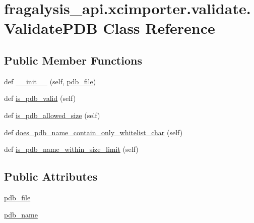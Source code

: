 \hypertarget{classfragalysis__api_1_1xcimporter_1_1validate_1_1_validate_p_d_b}{}\section{fragalysis\+\_\+api.\+xcimporter.\+validate.\+Validate\+P\+DB Class Reference}
\label{classfragalysis__api_1_1xcimporter_1_1validate_1_1_validate_p_d_b}
\subsection*{Public Member Functions}
\begin{DoxyCompactItemize}
\item 
def \hyperlink{classfragalysis__api_1_1xcimporter_1_1validate_1_1_validate_p_d_b_a2b688d0708ea4b2c01e2c436ff11b8b5}{\+\_\+\+\_\+init\+\_\+\+\_\+} (self, \hyperlink{classfragalysis__api_1_1xcimporter_1_1validate_1_1_validate_p_d_b_a9c42b0ed963d65498056ac184793b0f0}{pdb\+\_\+file})
\item 
def \hyperlink{classfragalysis__api_1_1xcimporter_1_1validate_1_1_validate_p_d_b_a7e6b2f1b0ea513e4485fabb411c5f3f5}{is\+\_\+pdb\+\_\+valid} (self)
\item 
def \hyperlink{classfragalysis__api_1_1xcimporter_1_1validate_1_1_validate_p_d_b_a9e9a8abbb1d90bb2cd17702178831f93}{is\+\_\+pdb\+\_\+allowed\+\_\+size} (self)
\item 
def \hyperlink{classfragalysis__api_1_1xcimporter_1_1validate_1_1_validate_p_d_b_a0775261c2b35a1f1861dabccbba32d02}{does\+\_\+pdb\+\_\+name\+\_\+contain\+\_\+only\+\_\+whitelist\+\_\+char} (self)
\item 
def \hyperlink{classfragalysis__api_1_1xcimporter_1_1validate_1_1_validate_p_d_b_a23b89548ce5a6619636348c711b7b27e}{is\+\_\+pdb\+\_\+name\+\_\+within\+\_\+size\+\_\+limit} (self)
\end{DoxyCompactItemize}
\subsection*{Public Attributes}
\begin{DoxyCompactItemize}
\item 
\hyperlink{classfragalysis__api_1_1xcimporter_1_1validate_1_1_validate_p_d_b_a9c42b0ed963d65498056ac184793b0f0}{pdb\+\_\+file}
\item 
\hyperlink{classfragalysis__api_1_1xcimporter_1_1validate_1_1_validate_p_d_b_a00933241a00b230d44e1c90155a797d6}{pdb\+\_\+name}
\end{DoxyCompactItemize}


